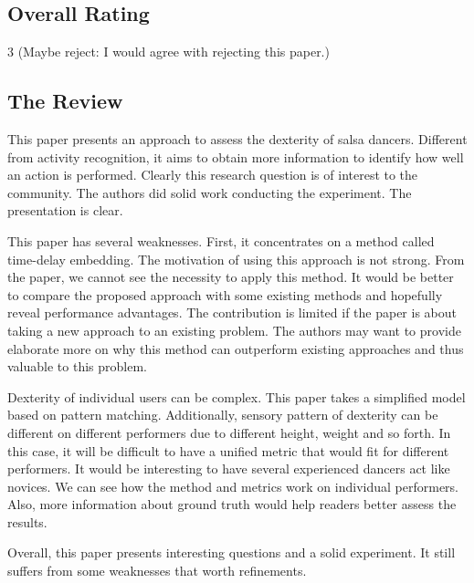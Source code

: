 \documentclass[8pt]{article}
\begin{document}
\subsection{Overall Rating}
   3  (Maybe reject: I would agree with rejecting this paper.)
   
\subsection{The Review}
   This paper presents an approach to assess the dexterity of salsa dancers.
   Different from activity recognition, it aims to obtain more information
   to identify how well an action is performed. Clearly this research
   question is of interest to the community. The authors did solid work
   conducting the experiment. The presentation is clear.

   This paper has several weaknesses. First, it concentrates on a method
   called time-delay embedding. The motivation of using this approach is not
   strong. From the paper, we cannot see the necessity to apply this method.
   It would be better to compare the proposed approach with some existing
   methods and hopefully reveal performance advantages. The contribution is
   limited if the paper is about taking a new approach to an existing
   problem. The authors may want to provide elaborate more on why this
   method can outperform existing approaches and thus valuable to this
   problem.

   Dexterity of individual users can be complex. This paper takes a
   simplified model based on pattern matching. Additionally, sensory pattern
   of dexterity can be different on different performers due to different
   height, weight and so forth. In this case, it will be difficult to have a
   unified metric that would fit for different performers. It would be
   interesting to have several experienced dancers act like novices. We can
   see how the method and metrics work on individual performers. Also, more
   information about ground truth would help readers better assess the
   results.

   Overall, this paper presents interesting questions and a solid
   experiment. It still suffers from some weaknesses that worth refinements.
\end{document}
